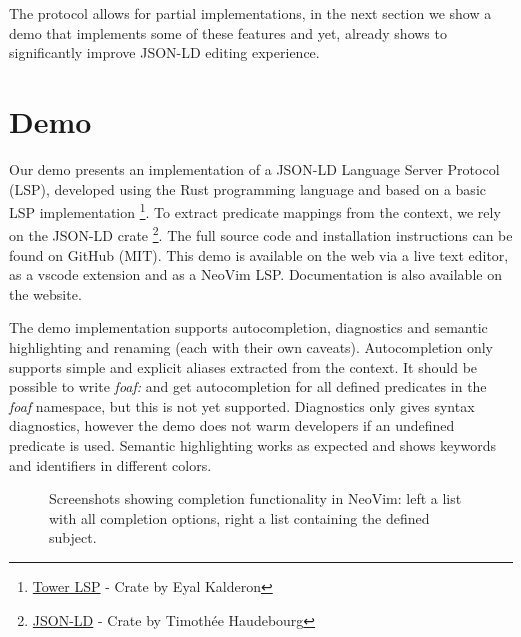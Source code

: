 \documentclass[
]{ceurart}
\begin{document}
The protocol allows for partial implementations, in the next section we show a demo that implements some of these features and yet, already shows to significantly improve JSON-LD editing experience.

\section{Demo}

Our demo presents an implementation of a JSON-LD Language Server Protocol (LSP), developed using the Rust programming language and based on a basic LSP implementation \footnote{\href{https://crates.io/crates/tower-lsp}{Tower LSP} - Crate by Eyal Kalderon}.
To extract predicate mappings from the context, we rely on the JSON-LD crate \footnote{\href{https://crates.io/crates/json-ld}{JSON-LD} - Crate by Timothée Haudebourg}.
The full source code and installation instructions can be found on GitHub (MIT).
This demo is available on the web via a live text editor, as a vscode extension and as a NeoVim LSP. Documentation is also available on the website. 

The demo implementation supports autocompletion, diagnostics and semantic highlighting and renaming (each with their own caveats). 
Autocompletion only supports simple and explicit aliases extracted from the context. 
It should be possible to write \textit{foaf:} and get autocompletion for all defined predicates in the \textit{foaf} namespace, but this is not yet supported.
Diagnostics only gives syntax diagnostics, however the demo does not warm developers if an undefined predicate is used.
Semantic highlighting works as expected and shows keywords and identifiers in different colors.


\begin{figure}
\centering
{}
\caption{Screenshots showing completion functionality in NeoVim: left a list with all completion options, right a list containing the defined subject.}
\label{fig:complete}
\end{figure}
\end{document}
